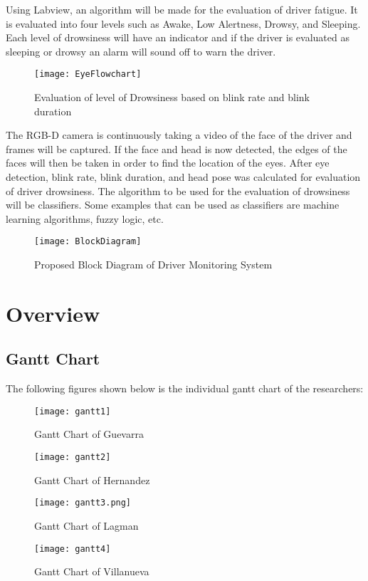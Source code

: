 \newpage
Using Labview, an algorithm will be made for the evaluation of driver fatigue. It is evaluated into four levels such as Awake, Low Alertness, Drowsy, and Sleeping. Each level of drowsiness will have an indicator and if the driver is evaluated as sleeping or drowsy an alarm will sound off to warn the driver. 

\begin{center}
\begin{figure}[ht]
	\centering
	\texttt{[image: EyeFlowchart]}
	\caption{ Evaluation of level of Drowsiness based on blink rate and blink duration}
\end{figure}
\end{center}

\newpage 
The RGB-D camera is continuously taking a video of the face of the driver and frames will be captured. If the face and head is now detected, the edges of the faces will then be taken in order to find the location of the eyes. After eye detection, blink rate, blink duration, and head pose was calculated for evaluation of driver drowsiness. The algorithm to be used for the evaluation of drowsiness will be classifiers. Some examples that can be used as classifiers are machine learning algorithms, fuzzy logic, etc.


\begin{center}
	\begin{figure}[ht]
		\centering
		\texttt{[image: BlockDiagram]}
		\caption{Proposed Block Diagram of Driver Monitoring System}
	\end{figure}
\end{center}

\section{Overview}

\subsection{Gantt Chart}
\newpage
The following figures shown below is the individual gantt chart of the researchers:

\begin{figure}[!htb]
	\centering
	\texttt{[image: gantt1]}
	\caption{Gantt Chart of Guevarra}
\end{figure}
\begin{figure}[!htb]
	\centering
	\texttt{[image: gantt2]}
	\caption{Gantt Chart of Hernandez}
\end{figure}
\begin{figure}[!htb]
	\centering
	\texttt{[image: gantt3.png]}
	\caption{Gantt Chart of Lagman}
\end{figure}
\begin{figure}[!htb]
	\centering
	\texttt{[image: gantt4]}
	\caption{Gantt Chart of Villanueva}
\end{figure}
\newpage
\newpage
